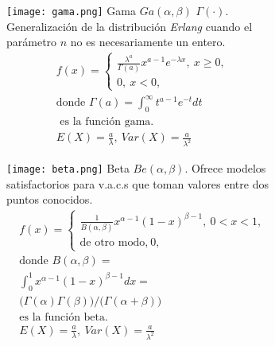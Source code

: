 \begin{figure}[H]
\begin{subfigure}[t]{.475\textwidth}\texttt{[image: gama.png]}
Gama $Ga(\alpha,\beta)$ $\Gamma(\cdot)$. Generalización de la distribución \emph{Erlang} cuando el parámetro $n$ no es necesariamente un entero.
\begin{equation}\begin{matrix}
f(x)=\begin{cases}\frac{\lambda^a}{\Gamma(a)}x^{a-1}e^{-\lambda x},\ x\geq 0,\\0,\ x<0,\end{cases}\\
\text{donde }\Gamma(a)=\int_{0}^{\infty}t^{a-1}e^{-t}dt\\\text{ es la función gama.}\\
E(X)=\frac{a}{\lambda},\ Var(X)=\frac{a}{\lambda^2}
\end{matrix}\end{equation}\end{subfigure}\qquad
\begin{subfigure}[t]{.475\textwidth}\texttt{[image: beta.png]}
Beta $Be(\alpha,\beta)$. Ofrece modelos satisfactorios para v.a.c.s que toman valores entre dos puntos conocidos.
\begin{equation}\begin{matrix}
f(x)=\begin{cases}\frac{1}{B(\alpha,\beta)}x^{\alpha-1}(1-x)^{\beta-1},\ 0<x<1,\\\text{de otro modo,}\ 0,\end{cases}\\
\text{donde } B(\alpha,\beta)=\\
\int_{0}^{1}x^{\alpha-1}(1-x)^{\beta-1}dx=\\
(\Gamma(\alpha)\Gamma(\beta)\big)/\big(\Gamma(\alpha+\beta)\big)\\
\text{es la función beta.}\\
E(X)=\frac{a}{\lambda},\ Var(X)=\frac{a}{\lambda^2}
\end{matrix}\end{equation}\end{subfigure}
\end{figure}